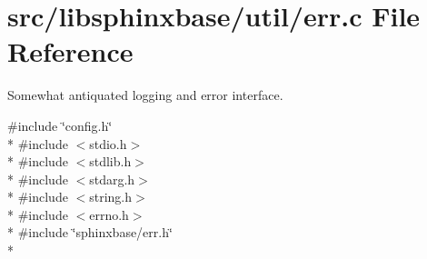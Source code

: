 \section{src/libsphinxbase/util/err.c File Reference}
\label{err_8c}


Somewhat antiquated logging and error interface.  


{\ttfamily \#include \char`\"{}config.\-h\char`\"{}}\\*
{\ttfamily \#include $<$stdio.\-h$>$}\\*
{\ttfamily \#include $<$stdlib.\-h$>$}\\*
{\ttfamily \#include $<$stdarg.\-h$>$}\\*
{\ttfamily \#include $<$string.\-h$>$}\\*
{\ttfamily \#include $<$errno.\-h$>$}\\*
{\ttfamily \#include \char`\"{}sphinxbase/err.\-h\char`\"{}}\\*
